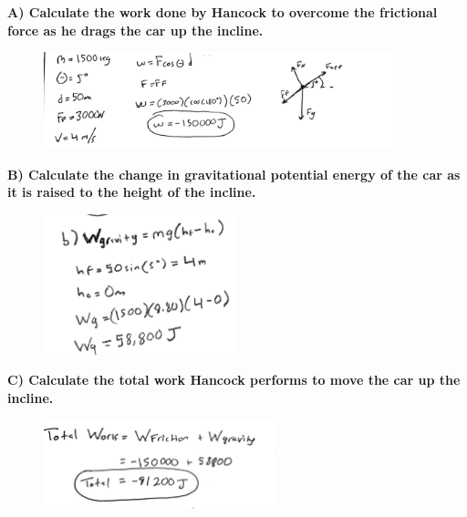 \documentclass[a4paper,12pt]{article}
\begin{document}
\noindent\textbf{A) Calculate the work done by Hancock to overcome the frictional force as he drags the car up the incline.} \\


\begin{figure}[H]
    \centering
    \includegraphics[width=0.9\textwidth]{U3_P1_A.jpg} %
\end{figure} 

\newpage

\noindent\textbf{B) Calculate the change in gravitational potential energy of the car as it is raised to the height of the incline.} \\


\begin{figure}[H]
    \centering
    \includegraphics[width=0.5\textwidth]{U3_P1_B} %
\end{figure}

\noindent\textbf{C) Calculate the total work Hancock performs to move the car up the incline.} \\


\begin{figure}[H]
    \centering
    \includegraphics[width=0.6\textwidth]{U3_P1_C.jpg} %
\end{figure}
\end{document}
